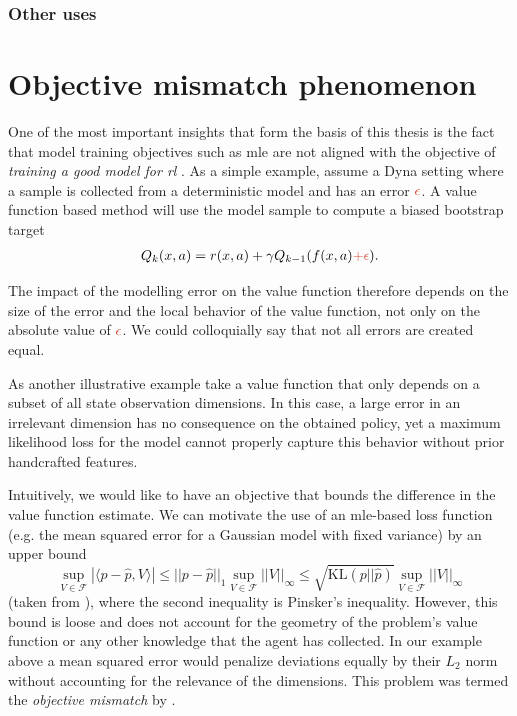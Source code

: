 \subsubsection{Other uses}


\section{Objective mismatch phenomenon}

\label{chap:background:objective}

One of the most important insights that form the basis of this thesis is the fact that model training objectives such as \ac{mle} are not aligned with the objective of \emph{training a good model for \ac{rl}} \parencite{schneider1997exploiting,kearns2002near,joseph2013reinforcement,vaml,talvitie2017self,lambert202objective}.
As a simple example, assume a Dyna setting where a sample is collected from a deterministic model and has an error ${\color{uoftred}\epsilon}$.
A value function based method will use the model sample to compute a biased bootstrap target
\begin{align}
    Q_k(\state,a) = r(\state,a) + \gamma Q_{k-1}(f(\state, a) {\color{uoftred} + \epsilon}).
\end{align}

The impact of the modelling error on the value function therefore depends on the size of the error and the local behavior of the value function, not only on the absolute value of ${\color{uoftred}\epsilon}$. 
We could colloquially say that not all errors are created equal.

As another illustrative example take a value function that only depends on a subset of all state observation dimensions. 
In this case, a large error in an irrelevant dimension has no consequence on the obtained policy, yet a maximum likelihood loss for the model cannot properly capture this behavior without prior handcrafted features.

Intuitively, we would like to have an objective that bounds the difference in the value function estimate.
We can motivate the use of an \ac{mle}-based loss function (e.g. the mean squared error for a Gaussian model with fixed variance) {by an upper bound}
$$\sup_{V \in \mathcal{F}}|\langle p - \hat{p}, V\rangle|\leq ||p - \hat{p}||_1 \sup_{V \in \mathcal{F}}||V||_\infty \leq \sqrt{\text{KL}(p||\hat{p})}\sup_{V \in \mathcal{F}}||V||_\infty$$ 
(taken from
\textcite{vaml}), where the second inequality is Pinsker's inequality.
However, this bound is loose and does not account for the geometry of the problem's value function or any other knowledge that the agent has collected. 
In our example above a mean squared error would penalize deviations equally by their $L_2$ norm without accounting for the relevance of the dimensions.
This problem was termed the \emph{objective mismatch} by \textcite{lambert202objective}.

